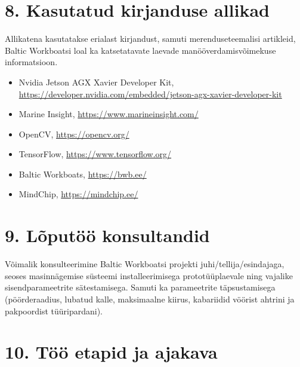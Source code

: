 \section*{8. Kasutatud kirjanduse allikad}

Allikatena kasutatakse erialast kirjandust, samuti merenduseteemalisi artikleid, Baltic Workboatsi loal ka katsetatavate laevade manööverdamisvõimekuse informatsioon.

\begin{itemize}
  \item Nvidia Jetson AGX Xavier Developer Kit, \url{https://developer.nvidia.com/embedded/jetson-agx-xavier-developer-kit}
  \item Marine Insight, \url{https://www.marineinsight.com/}
  \item OpenCV, \url{https://opencv.org/}
  \item TensorFlow, \url{https://www.tensorflow.org/}
  \item Baltic Workboats, \url{https://bwb.ee/}
  \item MindChip, \url{https://mindchip.ee/}
\end{itemize}

\section*{9. Lõputöö konsultandid}

Võimalik konsulteerimine Baltic Workboatsi projekti juhi/tellija/esindajaga, seoses masinnägemise süsteemi installeerimisega prototüüplaevale ning vajalike sisendparameetrite sätestamisega. Samuti ka parameetrite täpsustamisega (pöörderaadius, lubatud kalle, maksimaalne kiirus, kabariidid vöörist ahtrini ja pakpoordist tüüripardani).

\section*{10. Töö etapid ja ajakava}

